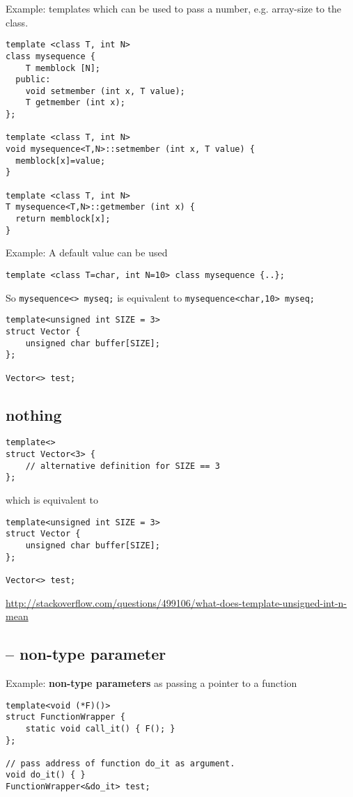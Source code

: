 Example:  templates which can be used to pass a
number, e.g. array-size to the class.
\begin{lstlisting}
template <class T, int N>
class mysequence {
    T memblock [N];
  public:
    void setmember (int x, T value);
    T getmember (int x);
};

template <class T, int N>
void mysequence<T,N>::setmember (int x, T value) {
  memblock[x]=value;
}

template <class T, int N>
T mysequence<T,N>::getmember (int x) {
  return memblock[x];
}
\end{lstlisting}

Example: A default value can be used
\begin{lstlisting}
template <class T=char, int N=10> class mysequence {..};
\end{lstlisting}
So \verb!mysequence<> myseq;! is equivalent to \verb!mysequence<char,10> myseq;!

\begin{lstlisting}
template<unsigned int SIZE = 3>
struct Vector {
    unsigned char buffer[SIZE];
};

Vector<> test;
\end{lstlisting}

\subsection{nothing }

\begin{lstlisting}
template<>
struct Vector<3> {
    // alternative definition for SIZE == 3
};

\end{lstlisting}
which is equivalent to 
\begin{lstlisting}
template<unsigned int SIZE = 3>
struct Vector {
    unsigned char buffer[SIZE];
};

Vector<> test;
\end{lstlisting}
\url{http://stackoverflow.com/questions/499106/what-does-template-unsigned-int-n-mean}

\subsection{-- non-type parameter}

Example: {\bf non-type parameters} as passing a pointer to a function
\begin{lstlisting}
template<void (*F)()>
struct FunctionWrapper {
    static void call_it() { F(); }
};

// pass address of function do_it as argument.
void do_it() { }
FunctionWrapper<&do_it> test;
\end{lstlisting}

